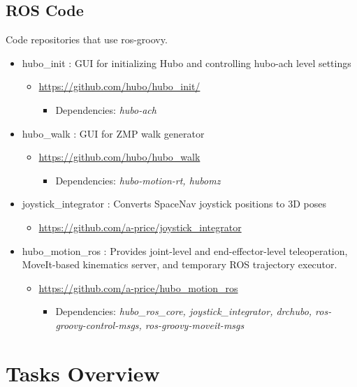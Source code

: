 \documentclass[letterpaper, 10 pt]{report}
\begin{document}
\section{ROS Code}
Code repositories that use ros-groovy.
\begin{itemize}
\item hubo\_init : GUI for initializing Hubo and controlling hubo-ach level settings
  \begin{itemize}
	\item \url{https://github.com/hubo/hubo\_init/}
	  \begin{itemize}
	    \item Dependencies: \textit{hubo-ach}
	  \end{itemize}
  \end{itemize}
\item hubo\_walk : GUI for ZMP walk generator
  \begin{itemize}
	\item \url{https://github.com/hubo/hubo\_walk}
	  \begin{itemize}
	    \item Dependencies: \textit{hubo-motion-rt, hubomz}
	  \end{itemize}
  \end{itemize}
\item joystick\_integrator : Converts SpaceNav joystick positions to 3D poses
  \begin{itemize}
    \item \url{https://github.com/a-price/joystick\_integrator}
  \end{itemize}
\item hubo\_motion\_ros : Provides joint-level and end-effector-level teleoperation, MoveIt-based kinematics server, and temporary ROS trajectory executor.
  \begin{itemize}
	\item \url{https://github.com/a-price/hubo\_motion\_ros}
	  \begin{itemize}
	    \item Dependencies: \textit{hubo\_ros\_core, joystick\_integrator, drchubo, ros-groovy-control-msgs, ros-groovy-moveit-msgs}
	  \end{itemize}
  \end{itemize}
\end{itemize}
\newpage

%
\chapter{Tasks Overview}
\end{document}
